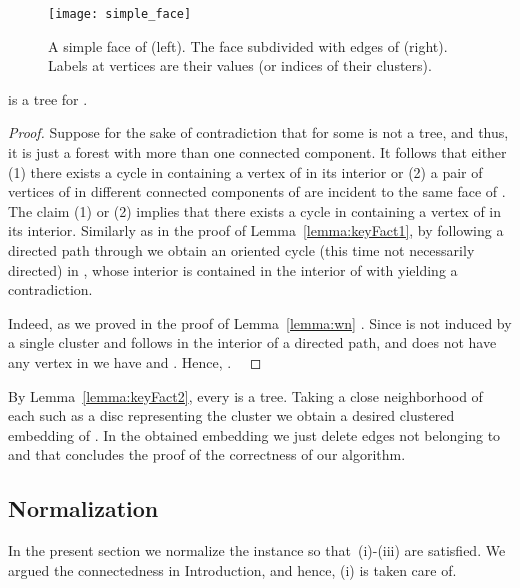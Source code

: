 \documentclass{llncs}
\def\qed{ \ \vrule width.2cm height.2cm depth0cm\smallskip}
\newif\iflong
\begin{document}
\begin{figure}\centering
\texttt{[image: simple\_face]}
\caption{A simple face  of  (left). The face  subdivided with edges of  (right). Labels at vertices are their  values (or indices of their clusters).}
\label{fig:simpleFace}
\end{figure}





\begin{lemma}
\label{lemma:keyFact2}
    is a tree for .
  \end{lemma}
\begin{proof}
Suppose for the sake of contradiction that  for some  is not a tree, and thus, it is just a  forest with more than one connected component.
It follows that either (1) there exists a cycle in 
containing a vertex  of  in its interior
or (2) a pair of vertices of  in different
connected components of   are incident to the same face of .  
The claim (1) or (2) implies that there exists a cycle
 in  containing a vertex  of  in its interior.
Similarly as in the proof of Lemma~\ref{lemma:keyFact1}, by following
a directed path through  we obtain 
an oriented cycle  (this time not necessarily directed) in ,  whose interior is contained in the interior of  with  yielding a contradiction.

Indeed, as we proved in  the proof of Lemma~\ref{lemma:wn} 
.
Since  is not induced by a single cluster and follows in the interior of  a directed path, and  does not have any vertex in  we have
  and .
Hence, . 
\qed\end{proof}






By Lemma~\ref{lemma:keyFact2}, every  is a tree. Taking a close neighborhood of each such  as a disc representing
the cluster  we obtain a desired clustered embedding of . In the obtained embedding we just delete edges not belonging to  and that concludes the proof of the correctness of our algorithm. \\







\subsection{Normalization}
 \label{sec:norm}

 
 
 In the present section we normalize the instance so that~(i)-(iii) are satisfied.
We argued the connectedness in Introduction, and hence, (i) is taken care of.
\iflong 
\end{document}
